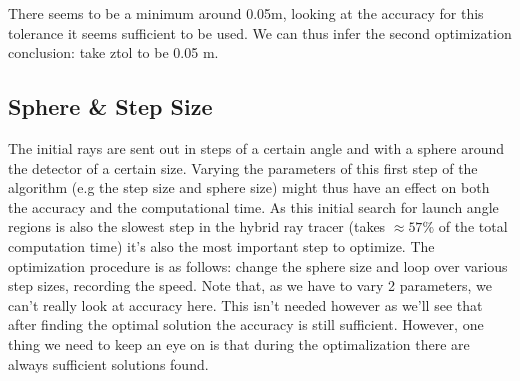 \newpage
There seems to be a minimum around 0.05m, looking at the
accuracy for this tolerance it seems sufficient to be used.  We can thus infer
the second optimization conclusion: take ztol to be 0.05 m.

\subsection{Sphere \& Step Size}
The initial rays are sent out in steps of a certain angle and with a sphere
around the detector of a certain size. Varying the parameters of this first
step of the algorithm (e.g the step size and sphere size) might thus have an
effect on both the accuracy and the computational time.  As this initial search
for launch angle regions is also the slowest step in the hybrid ray tracer (takes
$\approx 57\%$ of the total computation time)
it's also the most important step to optimize. The optimization procedure is as
follows: change the sphere size and loop over various step sizes, recording the
speed. Note that, as we have to vary 2 parameters, we can't really look at
accuracy here. This isn't needed however as we'll see that after finding the
optimal solution the accuracy is still sufficient. However, one thing we need to
keep an eye on is that during the optimalization there are always sufficient solutions found. 


